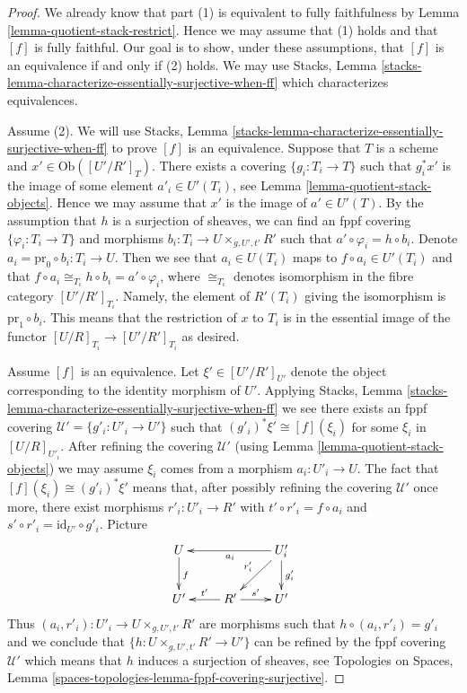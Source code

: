 \begin{proof}
We already know that part (1) is equivalent to
fully faithfulness by
Lemma \ref{lemma-quotient-stack-restrict}.
Hence we may assume that (1) holds and that $[f]$ is fully faithful.
Our goal is to show, under these assumptions, that $[f]$ is an equivalence
if and only if (2) holds. We may use
Stacks, Lemma \ref{stacks-lemma-characterize-essentially-surjective-when-ff}
which characterizes equivalences.

\medskip\noindent
Assume (2). We will use
Stacks, Lemma \ref{stacks-lemma-characterize-essentially-surjective-when-ff}
to prove $[f]$ is an equivalence.
Suppose that $T$ is a scheme and $x' \in \text{Ob}([U'/R']_T)$.
There exists a covering $\{g_i : T_i \to T\}$ such that $g_i^*x'$
is the image of some element $a'_i \in U'(T_i)$, see
Lemma \ref{lemma-quotient-stack-objects}.
Hence we may assume that $x'$ is the image of $a' \in U'(T)$.
By the assumption that $h$ is a surjection of sheaves, we
can find an fppf covering $\{\varphi_i : T_i \to T\}$ and morphisms
$b_i : T_i \to U \times_{g, U', t'} R'$ such that
$a' \circ \varphi_i = h \circ b_i$. Denote
$a_i = \text{pr}_0 \circ b_i : T_i \to U$. Then we see that
$a_i \in U(T_i)$ maps to $f \circ a_i \in U'(T_i)$ and
that $f \circ a_i \cong_{T_i} h \circ b_i = a' \circ \varphi_i$,
where $\cong_{T_i}$ denotes isomorphism in the fibre category
$[U'/R']_{T_i}$. Namely, the element of $R'(T_i)$ giving the isomorphism
is $\text{pr}_1 \circ b_i$. This means that the restriction
of $x$ to $T_i$ is in the essential image of the functor
$[U/R]_{T_i} \to [U'/R']_{T_i}$ as desired.

\medskip\noindent
Assume $[f]$ is an equivalence. Let $\xi' \in [U'/R']_{U'}$ denote the
object corresponding to the identity morphism of $U'$. Applying
Stacks, Lemma \ref{stacks-lemma-characterize-essentially-surjective-when-ff}
we see there exists an fppf covering $\mathcal{U}' = \{g'_i : U'_i \to U'\}$
such that $(g'_i)^*\xi' \cong [f](\xi_i)$ for some $\xi_i$ in $[U/R]_{U'_i}$.
After refining the covering $\mathcal{U}'$ (using
Lemma \ref{lemma-quotient-stack-objects})
we may assume $\xi_i$ comes from a morphism $a_i : U'_i \to U$.
The fact that $[f](\xi_i) \cong (g'_i)^*\xi'$ means that, after possibly
refining the covering $\mathcal{U}'$ once more, there exist morphisms
$r'_i : U'_i \to R'$ with $t' \circ r'_i = f \circ a_i$ and
$s' \circ r'_i = \text{id}_{U'} \circ g'_i$. Picture
$$
\xymatrix{
U \ar[d]^f & & U'_i \ar[ll]^{a_i} \ar[ld]_{r'_i} \ar[d]^{g'_i} \\
U' & R' \ar[l]_{t'} \ar[r]^{s'} & U'
}
$$
Thus $(a_i, r'_i) : U'_i \to U \times_{g, U', t'} R'$ are morphisms
such that $h \circ (a_i, r'_i) = g'_i$ and we conclude that
$\{h : U \times_{g, U', t'} R' \to U'\}$ can be refined by the
fppf covering $\mathcal{U}'$ which means that $h$ induces a surjection
of sheaves, see
Topologies on Spaces, Lemma
\ref{spaces-topologies-lemma-fppf-covering-surjective}.


\end{proof}
